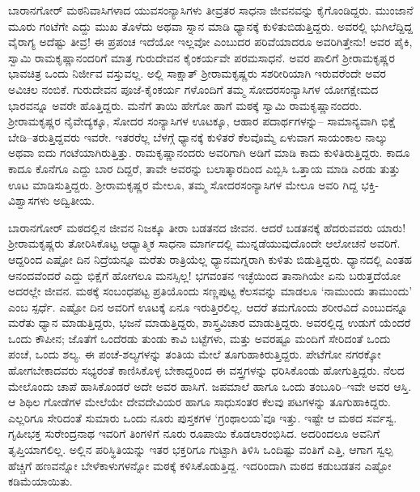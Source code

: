 ಬಾರಾನಗೋರ್ ಮಠನಿವಾಸಿಗಳಾದ ಯುವಸಂನ್ಯಾಸಿಗಳು ತೀವ್ರತರ ಸಾಧನಾ ಜೀವನವನ್ನು ಕೈಗೊಂಡಿದ್ದರು. ಮುಂಜಾನೆ ಮೂರು ಗಂಟೆಗೇ ಎದ್ದು ಮುಖ ತೊಳೆದು ಅಥವಾ ಸ್ನಾನ ಮಾಡಿ ಧ್ಯಾನಕ್ಕೆ ಕುಳಿತುಬಿಡುತ್ತಿದ್ದರು. ಅವರಲ್ಲಿ ಭುಗಿಲೆದ್ದಿದ್ದ ವೈರಾಗ್ಯ ಅದೆಷ್ಟು ತೀವ್ರ! ಈ ಪ್ರಪಂಚ ಇದೆಯೋ ಇಲ್ಲವೋ ಎಂಬುದರ ಪರಿವೆಯಾದರೂ ಅವರಿಗಿತ್ತೇನು! ಅವರ ಪೈಕಿ, ಸ್ವಾಮಿ ರಾಮಕೃಷ್ಣಾನಂದರಿಗೆ ಮಾತ್ರ ಗುರುದೇವನ ಕೈಂಕರ್ಯವೇ ಪರಮಸಾಧನೆ. ಅವರ ಪಾಲಿಗೆ ಶ್ರೀರಾಮಕೃಷ್ಣರ ಭಾವಚಿತ್ರ ಒಂದು ನಿರ್ಜೀವ ವಸ್ತುವಲ್ಲ. ಅಲ್ಲಿ ಸಾಕ್ಷಾತ್ ಶ್ರೀರಾಮಕೃಷ್ಣರು ಸಶರೀರಿಯಾಗಿ ಇರುವರೆಂದೇ ಅವರ ಅವಿಚಲ ನಂಬಿಕೆ. ಗುರುದೇವನ ಪೂಜೆ-ಕೈಂಕರ್ಯ ಗಳೊಂದಿಗೆ ತಮ್ಮ ಸೋದರಸಂನ್ಯಾಸಿಗಳ ಯೋಗಕ್ಷೇಮದ ಭಾರವನ್ನೂ ಅವರೇ ಹೊತ್ತಿದ್ದರು. ಮನೆಗೆ ತಾಯಿ ಹೇಗೋ ಹಾಗೆ ಮಠಕ್ಕೆ ಸ್ವಾಮಿ ರಾಮಕೃಷ್ಣಾನಂದರು. ಶ್ರೀರಾಮಕೃಷ್ಣರ ನೈವೇದ್ಯಕ್ಕೂ, ಸೋದರ ಸಂನ್ಯಾಸಿಗಳ ಊಟಕ್ಕೂ, ಆಹಾರ ಪದಾರ್ಥಗಳನ್ನು– ಸಾಮಾನ್ಯವಾಗಿ ಭಿಕ್ಷೆ ಬೇಡಿ–ತರುತ್ತಿದ್ದವರು ಇವರೇ. ಇತರರೆಲ್ಲ ಬೆಳಗ್ಗೆ ಧ್ಯಾನಕ್ಕೆ ಕುಳಿತರೆ ಕೆಲವೊಮ್ಮೆ ಏಳುವಾಗ ಸಾಯಂಕಾಲ ನಾಲ್ಕು ಅಥವಾ ಐದು ಗಂಟೆಯಾಗಿರುತ್ತಿತ್ತು. ರಾಮಕೃಷ್ಣಾನಂದರು ಅವರಿಗಾಗಿ ಅಡಿಗೆ ಮಾಡಿ ಕಾದು ಕುಳಿತಿರುತ್ತಿದ್ದರು. ಕಾದೂ ಕಾದೂ ಕೊನೆಗೂ ಎದ್ದು ಬಾರ ದಿದ್ದರೆ, ತಾವೇ ಅವರನ್ನು ಬಲಾತ್ಕಾರದಿಂದ ಎಬ್ಬಿಸಿ ಒತ್ತಾಯ ಮಾಡಿ ಎರಡು ತುತ್ತು ಊಟ ಮಾಡಿಸುತ್ತಿದ್ದರು. ಶ್ರೀರಾಮಕೃಷ್ಣರ ಮೇಲೂ, ತಮ್ಮ ಸೋದರಸಂನ್ಯಾಸಿಗಳ ಮೇಲೂ ಅವರಿ ಗಿದ್ದ ಭಕ್ತಿ-ವಿಶ್ವಾಸಗಳು ಅದ್ವಿತೀಯ.

ಬಾರಾನಗೋರ್ ಮಠದಲ್ಲಿನ ಜೀವನ ನಿಜಕ್ಕೂ ತೀರಾ ಬಡತನದ ಜೀವನ. ಆದರೆ ಬಡತನಕ್ಕೆ ಹೆದರುವವರು ಯಾರು! ಶ್ರೀರಾಮಕೃಷ್ಣರು ತೋರಿಸಿಕೊಟ್ಟ ಆಧ್ಯಾತ್ಮಿಕ ಸಾಧನಾ ಮಾರ್ಗದಲ್ಲಿ ಮುನ್ನಡೆಯುವುದೊಂದೇ ಆಲೋಚನೆ ಅವರಿಗೆ. ಆದ್ದರಿಂದ ಎಷ್ಟೋ ದಿನ ನಿದ್ರೆಯನ್ನೂ ಮರೆತು ರಾತ್ರಿಯೆಲ್ಲ ಧ್ಯಾನಮಗ್ನರಾಗಿ ಕುಳಿತು ಬಿಡುತ್ತಿದ್ದರು. ಧ್ಯಾನದಲ್ಲಿ ಎಂತಹ ಆನಂದವೆಂದರೆ ಎದ್ದು ಭಿಕ್ಷೆಗೆ ಹೋಗಲೂ ಮನಸ್ಸಿಲ್ಲ! ಭಗವಂತನ ಇಚ್ಛೆಯಿಂದ ತಾನಾಗಿಯೇ ಏನು ಬರುತ್ತದೆಯೋ ಅದರಲ್ಲೇ ಜೀವನ. ಮಠಕ್ಕೆ ಸಂಬಂಧಪಟ್ಟ ಪ್ರತಿಯೊಂದು ಸಣ್ಣಪುಟ್ಟ ಕೆಲಸವನ್ನು ಮಾಡಲೂ ‘ನಾಮುಂದು ತಾಮುಂದು’ ಎಂಬ ಸ್ಪರ್ಧೆ. ಎಷ್ಟೋ ದಿನ ಅವರಿಗೆ ಊಟಕ್ಕೆ ಏನೂ ಇರುತ್ತಿರಲಿಲ್ಲ. ಆದರೆ ತಮಗೊಂದು ಶರೀರವಿದೆ ಎಂಬುದನ್ನೂ ಮರೆತು ಧ್ಯಾನ ಮಾಡುತ್ತಿದ್ದರು, ಭಜನೆ ಮಾಡುತ್ತಿದ್ದರು, ಶಾಸ್ತ್ರವಿಚಾರ ಮಾಡುತ್ತಿದ್ದರು. ಅವರಲ್ಲಿದ್ದ ಉಡುಗೆ ಯೆಂದರೆ ಒಂದು ಕೌಪೀನ; ಜೊತೆಗೆ ಒಂದೆರಡು ತುಂಡು ಕಾವಿ ಬಟ್ಟೆಗಳು, ಮತ್ತು ಅವರಷ್ಟೂ ಮಂದಿಗೆ ಸೇರಿದಂತೆ ಒಂದು ಪಂಚೆ, ಒಂದು ಶಲ್ಯ. ಈ ಪಂಚೆ-ಶಲ್ಯಗಳನ್ನು ತಂತಿಯ ಮೇಲೆ ತೂಗುಹಾಕಿರುತ್ತಿದ್ದರು. ಪೇಟೆಗೋ ನಗರಕ್ಕೋ ಹೋಗಬೇಕಾದವರು ಸಭ್ಯರಂತೆ ಕಾಣಿಸಿಕೊಳ್ಳ ಬೇಕಾದ್ದರಿಂದ ಈ ವಸ್ತ್ರಗಳನ್ನು ಧರಿಸಿಕೊಂಡು ಹೋಗುತ್ತಿದ್ದರು. ನೆಲದ ಮೇಲೊಂದು ಚಾಪೆ ಹಾಸಿಕೊಂಡರೆ ಅದೇ ಅವರ ಹಾಸಿಗೆ. ಜಪಮಾಲೆ ಹಾಗೂ ಒಂದು ತಂಬೂರಿ–ಇವೇ ಅವರ ಆಸ್ತಿ. ಆ ಶಿಥಿಲ ಗೋಡೆಗಳ ಮೇಲೆಯೇ ದೇವದೇವಿಯರ ಹಾಗೂ ಸಾಧುಸಂತರ ಕೆಲವು ಪಟಗಳನ್ನು ತೂಗುಹಾಕಿದ್ದರು. ಎಲ್ಲರಿಗೂ ಸೇರಿದಂತೆ ಸುಮಾರು ಒಂದು ನೂರು ಪುಸ್ತಕಗಳ ‘ಗ್ರಂಥಾಲಯ’ವೂ ಇತ್ತು. ಇಷ್ಟೇ ಆ ಮಠದ ಸರ್ವಸ್ವ. ಗೃಹೀಭಕ್ತ ಸುರೇಂದ್ರನಾಥ ಇವರಿಗೆ ತಿಂಗಳಿಗೆ ನೂರು ರೂಪಾಯಿ ಕೊಡಲಾರಂಭಿಸಿದ. ಅದರಿಂದಲೂ ಅವನಿಗೆ ತೃಪ್ತಿಯಾಗಲಿಲ್ಲ. ಅಲ್ಲಿನ ಪರಿಸ್ಥಿತಿಯನ್ನು ಇತರ ಭಕ್ತರಿಗೂ ಗುಟ್ಟಾಗಿ ತಿಳಿಸಿ ಒಂದಿಷ್ಟು ವಂತಿಗೆ ಎತ್ತಿ, ಆಗಾಗ ಸ್ವಲ್ಪ ಹೆಚ್ಚಿಗೆ ಹಣವನ್ನೋ ಬೇಳೆಕಾಳುಗಳನ್ನೋ ಮಠಕ್ಕೆ ಕಳಿಸಿಕೊಡುತ್ತಿದ್ದ. ಇದರಿಂದಾಗಿ ಮಠದ ಕಡುಬಡತನ ಎಷ್ಟೋ ಕಡಿಮೆಯಾಯಿತು.

